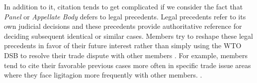 In addition to it, citation tends to get complicated
if we consider the fact that \textit{Panel} or \textit{Appellate Body} defers to legal precedents.
Legal precedents refer to its own judicial decisions
and these precedents provide authoritative reference
for deciding subsequent identical or similar cases.
Members try to reshape these legal precedents
in favor of their future interest rather than
simply using the WTO DSB to resolve their trade
dispute with other members \citep{pelc}. For example,
members tend to cite their
favorable previous cases more often in specific
trade issue areas where they face ligitagion more frequently with other members.
\citep{latent}.


